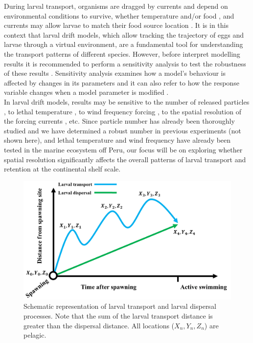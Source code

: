 During larval transport, organisms are dragged by currents and depend on environmental conditions to survive, whether temperature and/or food \citep{NocrShaw1984}, and currents may allow larvae to match their food source location \citep{CuryRoy1989}. It is in this context that larval drift models, which allow tracking the trajectory of eggs and larvae through a virtual environment, are a fundamental tool for understanding the transport patterns of different species. However, before interpret modelling results it is recommended to perform a sensitivity analysis to test the robustness of these results \citep{PeckHufn2012,SimoSieg2013}. Sensitivity analysis examines how a model's behaviour is affected by changes in its parameters and it can also refer to how the response variable changes when a model parameter is modified \citep{Hamb1994,Inga2008}.\\

In larval drift models, results may be sensitive to the number of released particles \citep{SimoSieg2013}, to lethal temperature \citep{BrocLett2008}, to wind frequency forcing \citep{FlorTam2019}, to the spatial resolution of the forcing currents \citep{GaraKapl2014}, etc. Since particle number has already been thoroughly studied and we have determined a robust number in previous experiments (not shown here), and lethal temperature and wind frequency have already been tested in the marine ecosystem off Peru, our focus will be on exploring whether spatial resolution significantly affects the overall patterns of larval transport and retention at the continental shelf scale.\\

\begin{figure}[H]
	\includegraphics[width=1.0\textwidth]{figures/Chap2LarvalTransport.png}
	\centering
	\caption{Schematic representation of larval transport and larval dispersal processes. Note that the sum of the larval transport distance is greater than the dispersal distance. All locations ($X_{n},Y_{n},Z_{n}$) are pelagic.}
	\label{Chap2LarvalTransport}
\end{figure}

